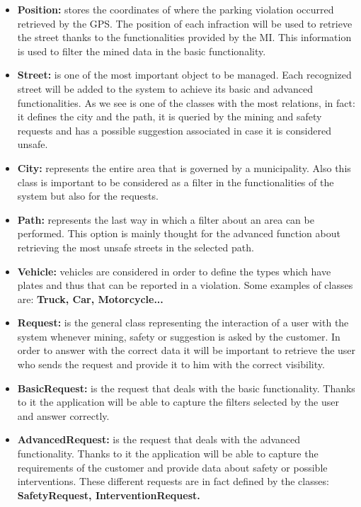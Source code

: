 \begin{itemize}
		\item \textbf{Position:} stores the coordinates of where the parking violation occurred retrieved by the GPS. The position of each infraction will be used to retrieve the street thanks to the functionalities provided by the MI. This information is used to filter the mined data in the basic functionality.
		
		\item \textbf{Street:} is one of the most important object to be managed. Each recognized street will be added to the system to achieve its basic and advanced functionalities. As we see is one of the classes with the most relations, in fact: it defines the city and the path, it is queried by the mining and safety requests and has a possible suggestion associated in case it is considered unsafe.
		
		\item \textbf{City:} represents the entire area that is governed by a municipality. Also this class is important to be considered as a filter in the functionalities of the system but also for the requests.
		
		\item \textbf{Path:} represents the last way in which a filter about an area can be performed. This option is mainly thought for the advanced function about retrieving the most unsafe streets in the selected path.
		
		\item \textbf{Vehicle:} vehicles are considered in order to define the types which have plates and thus that can be reported in a violation. Some examples of classes are: \textbf{Truck, Car, Motorcycle...}
		
		\item \textbf{Request:} is the general class representing the interaction of a user with the system whenever mining, safety or suggestion is asked by the customer. In order to answer with the correct data it will be important to retrieve the user who sends the request and provide it to him with the correct visibility.
		
		\item \textbf{BasicRequest:} is the request that deals with the basic functionality. Thanks to it the application will be able to capture the filters selected by the user and answer correctly.
		
		\item \textbf{AdvancedRequest:} is the request that deals with the advanced functionality. Thanks to it the application will be able to capture the requirements of the customer and provide data about safety or possible interventions. These different requests are in fact defined by the classes: \textbf{SafetyRequest, InterventionRequest.}
		

\end{itemize}
